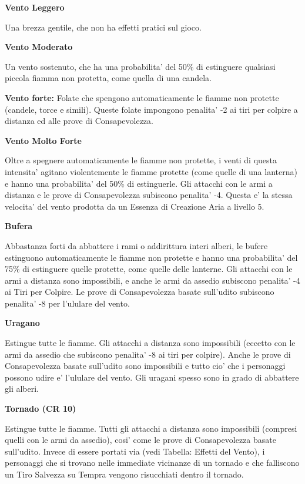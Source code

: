 \documentclass[a4paper,11pt,twoside,openany]{book}
\begin{document}
{		\bigskip
		
		\textbf{Vento Leggero}
		
		Una brezza gentile, che non ha effetti pratici sul gioco.
		
		\textbf{Vento Moderato}
		
		Un vento sostenuto, che ha una probabilita' del 50\% di estinguere qualsiasi piccola fiamma non protetta, come quella di una candela.
		
		\textbf{Vento forte:} Folate che spengono automaticamente le fiamme non protette (candele, torce e simili). Queste folate impongono penalita' -2 ai tiri per colpire a distanza ed alle prove di Consapevolezza.
		
		\textbf{Vento Molto Forte}
		
		Oltre a spegnere automaticamente le fiamme non protette, i venti di questa intensita' agitano violentemente le fiamme protette (come quelle di una lanterna) e hanno una probabilita' del 50\% di estinguerle. Gli attacchi con le armi a distanza e le prove di Consapevolezza subiscono penalita' -4. Questa e' la stessa velocita' del vento prodotta da un Essenza di Creazione Aria a livello 5.
		
		\textbf{Bufera}
		
		Abbastanza forti da abbattere i rami o addirittura interi alberi, le bufere estinguono automaticamente le fiamme non protette e hanno una probabilita' del 75\% di estinguere quelle protette, come quelle delle lanterne. Gli attacchi con le armi a distanza sono impossibili, e anche le armi da assedio subiscono penalita' -4 ai Tiri per Colpire. Le prove di Consapevolezza basate sull'udito subiscono penalita' -8 per l'ululare del vento.
		
		\textbf{Uragano}
		
		Estingue tutte le fiamme. Gli attacchi a distanza sono impossibili (eccetto con le armi da assedio che subiscono penalita' -8 ai tiri per colpire). Anche le prove di Consapevolezza basate sull'udito sono impossibili e tutto cio' che i personaggi possono udire e' l'ululare del vento. Gli uragani spesso sono in grado di abbattere gli alberi.
		
		\textbf{Tornado (CR 10)}
		
		Estingue tutte le fiamme. Tutti gli attacchi a distanza sono impossibili (compresi quelli con le armi da assedio), cosi' come le prove di Consapevolezza basate sull'udito. Invece di essere portati via (vedi Tabella: Effetti del Vento), i personaggi che si trovano nelle immediate vicinanze di un tornado e che falliscono un Tiro Salvezza su Tempra vengono risucchiati dentro il tornado.
		
}
\end{document}
